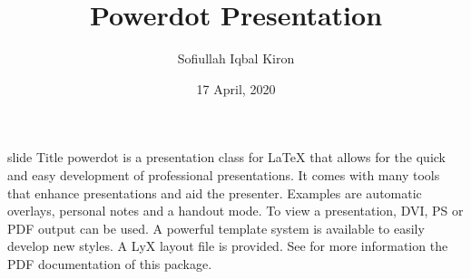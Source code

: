 \documentclass[11 pt]{powerdot}
\title{Powerdot Presentation}
\author{Sofiullah Iqbal Kiron}
\date{17 April, 2020}
\begin{document}
\begin{slide}{slide Title}
powerdot is a presentation class for LaTeX that allows for the quick
and easy development of professional presentations. It comes with
many tools that enhance presentations and aid the presenter.
Examples are automatic overlays, personal notes and a handout mode.
To view a presentation, DVI, PS or PDF output can be used. A
powerful template system is available to easily develop new styles.
A LyX layout file is provided. See for more information the PDF
documentation of this package.
\end{slide}
\end{document}
